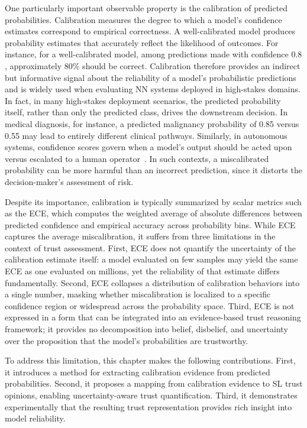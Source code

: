 One particularly important observable property is the calibration of predicted probabilities. Calibration measures the degree to which a model’s confidence estimates correspond to empirical correctness. A well-calibrated model produces probability estimates that accurately reflect the likelihood of outcomes. For instance, for a well-calibrated model, among predictions made with confidence $0.8$, approximately $80\%$ should be correct. Calibration therefore provides an indirect but informative signal about the reliability of a model’s probabilistic predictions and is widely used when evaluating \ac{NN} systems deployed in high-stakes domains. In fact, in many high-stakes deployment scenarios, the predicted probability itself, rather than only the predicted class, drives the downstream decision. In medical diagnosis, for instance, a predicted malignancy probability of 0.85 versus 0.55 may lead to entirely different clinical pathways. Similarly, in autonomous systems, confidence scores govern when a model's output should be acted upon versus escalated to a human operator~\cite{feng2019trustyoucalibrationprobabilistic}. In such contexts, a miscalibrated probability can be more harmful than an incorrect prediction, since it distorts the decision-maker's assessment of risk.

Despite its importance, calibration is typically summarized by scalar metrics such as the \acf{ECE}, which computes the weighted average of absolute differences between predicted confidence and empirical accuracy across probability bins. While \ac{ECE} captures the average miscalibration, it suffers from three limitations in the context of trust assessment. First, \ac{ECE} does not quantify the uncertainty of the calibration estimate itself: a model evaluated on few samples may yield the same \ac{ECE} as one evaluated on millions, yet the reliability of that estimate differs fundamentally. Second, \ac{ECE} collapses a distribution of calibration behaviors into a single number, masking whether miscalibration is localized to a specific confidence region or widespread across the probability space. Third, \ac{ECE} is not expressed in a form that can be integrated into an evidence-based trust reasoning framework; it provides no decomposition into belief, disbelief, and uncertainty over the proposition that the model's probabilities are trustworthy.

To address this limitation, this chapter makes the following contributions. First, it introduces a method for extracting calibration evidence from predicted probabilities. Second, it proposes a mapping from calibration evidence to \ac{SL} trust opinions, enabling uncertainty-aware trust quantification. Third, it demonstrates experimentally that the resulting trust representation provides rich insight into model reliability.

